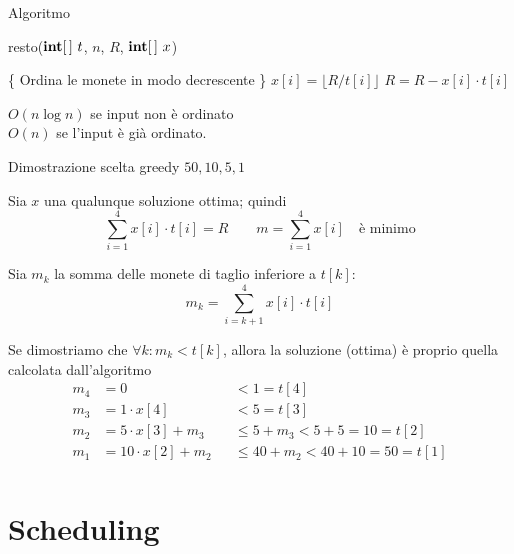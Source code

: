\begin{frame}{Algoritmo}
	
\begin{Procedure}
\caption[A]{\textsf{resto}($\INTARRAY\ t$, \INTEGER $n$, \INTEGER $R$, $\INTARRAY\ x$)}
\{ Ordina le monete in modo decrescente \}\;
 {
  $x[i] = \lfloor R/t[i] \rfloor$\;
  $R = R - x[i] \cdot t[i]$\;
}
\end{Procedure}
	
 $O(n \log n)$ se input non è ordinato\\
\makebox[2.5cm][l]{} $O(n)$ se l'input è già ordinato.

\end{frame}

\begin{frame}{Dimostrazione scelta greedy $50,10,5,1$}

\vspace{-9pt}
\BIL
\item Sia $x$ una qualunque soluzione ottima; quindi
\[
	\sum_{i=1}^4 x[i] \cdot t[i] = R \qquad m = \sum_{i=1}^4 x[i] \quad \textrm{è minimo}
\]

\item Sia $m_k$ la somma delle monete di taglio inferiore a $t[k]$:
\[
  m_k = \sum_{i=k+1}^4 x[i] \cdot  t[i]
\]

\item 
Se dimostriamo che $\forall k: m_k < t[k]$, allora la soluzione (ottima)
è proprio quella calcolata dall'algoritmo\\[-6pt]
\begin{align*}
m_4 &= 0 &&< 1 = t[4] \\
m_3 &= 1 \cdot x[4] && < 5 = t[3] \\
m_2 &= 5 \cdot x[3] + m_3 &&\leq 5 + m_3 < 5 + 5 = 10 = t[2] \\
m_1 &= 10 \cdot x[2] + m_2 && \leq 40 + m_2 < 40 + 10 = 50 = t[1] \\
\end{align*}
\EIL

\end{frame}

\section{Scheduling}

